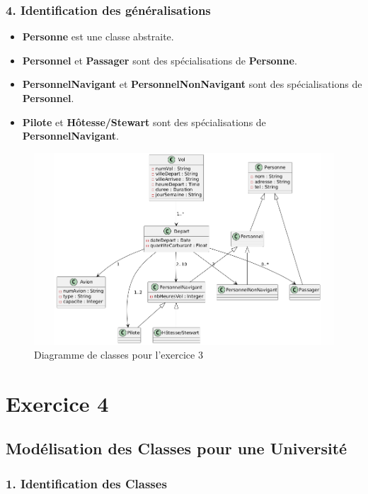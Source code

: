 \documentclass{article}
\begin{document}
\subsubsection*{4. Identification des généralisations}

\begin{itemize}
  \item \textbf{Personne} est une classe abstraite.
  \item \textbf{Personnel} et \textbf{Passager} sont des spécialisations de \textbf{Personne}.
  \item \textbf{PersonnelNavigant} et \textbf{PersonnelNonNavigant} sont des spécialisations de \textbf{Personnel}.
  \item \textbf{Pilote} et \textbf{Hôtesse/Stewart} sont des spécialisations de \textbf{PersonnelNavigant}.
\end{itemize}

\begin{figure}[H]
  \centering
  \includegraphics[width=\textwidth]{exo3.png}
  \caption{Diagramme de classes pour l'exercice 3}
\end{figure}

\section*{Exercice 4}

\subsection*{Modélisation des Classes pour une Université}

\subsubsection*{1. Identification des Classes}
\end{document}
